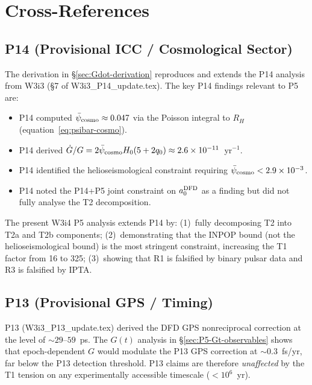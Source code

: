\documentclass[aps,prd,twocolumn,superscriptaddress,nofootinbib,longbibliography]{revtex4-2}
\newcommand{\psibar}{\bar{\psi}}
\newcommand{\ee}[1]{\times 10^{#1}}
\begin{document}
\section{Cross-References}
\label{sec:crossrefs}

\subsection{P14 (Provisional ICC / Cosmological Sector)}
\label{sec:P14-crossref}

The derivation in \S\ref{sec:Gdot-derivation} reproduces and extends the
P14 analysis from W3i3 (\S7 of W3i3\_P14\_update.tex).  The key P14
findings relevant to P5 are:
\begin{itemize}
\item P14 computed $\psibar_{\rm cosmo} \approx 0.047$ via the Poisson
  integral to $R_H$ (equation~\ref{eq:psibar-cosmo}).
\item P14 derived $\dot{G}/G = 2\psibar_{\rm cosmo}H_0(5+2q_0)
  \approx 2.6\ee{-11}$~yr$^{-1}$.
\item P14 identified the helioseismological constraint requiring
  $\psibar_{\rm cosmo} < 2.9\ee{-3}$.
\item P14 noted the P14+P5 joint constraint on $a_0^{\rm DFD}$ as a
  finding but did not fully analyse the T2 decomposition.
\end{itemize}

The present W3i4 P5 analysis extends P14 by: (1)~fully decomposing T2 into
T2a and T2b components; (2)~demonstrating that the INPOP bound (not the
helioseismological bound) is the most stringent constraint, increasing the
T1 factor from 16 to 325; (3)~showing that R1 is falsified by binary pulsar
data and R3 is falsified by IPTA.

\subsection{P13 (Provisional GPS / Timing)}
\label{sec:P13-crossref}

P13 (W3i3\_P13\_update.tex) derived the DFD GPS nonreciprocal correction at
the level of $\sim\!29$--$59$~ps.  The $G(t)$ analysis in \S\ref{sec:P5-Gt-observables}
shows that epoch-dependent $G$ would modulate the P13 GPS correction at
$\sim\!0.3$~fs/yr, far below the P13 detection threshold.  P13 claims are
therefore \emph{unaffected} by the T1 tension on any experimentally
accessible timescale ($< 10^6$~yr).
\end{document}
